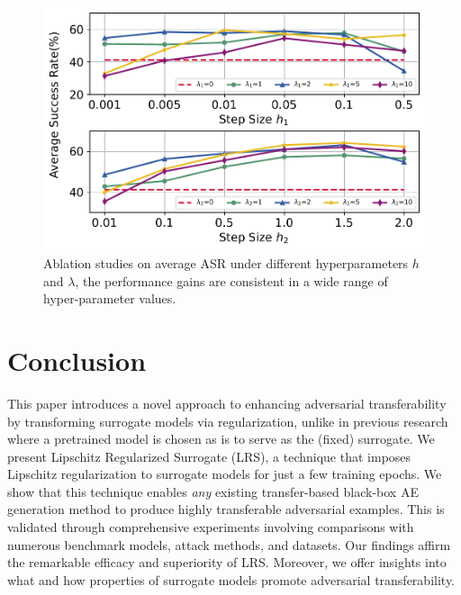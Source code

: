 \documentclass[letterpaper]{article} %
\theoremstyle{plain}
\theoremstyle{definition}
\begin{document}
\begin{figure}[h!]
    \centering
    \includegraphics[width=\linewidth]{figs/ablation.pdf}\vspace{-1mm}
    \caption{Ablation studies on average ASR under different hyperparameters $h$ and $\lambda$, the performance gains are consistent in a wide range of hyper-parameter values.}
    \label{fig:ablation}\vspace{-2mm}
\end{figure}

\section{Conclusion}  \label{sec:conclusion} 
This paper introduces a novel approach to enhancing adversarial transferability by transforming surrogate models via regularization, unlike in previous research where a pretrained model is chosen as is to serve as the (fixed) surrogate. We present Lipschitz Regularized Surrogate (LRS), a technique that imposes Lipschitz regularization to surrogate models for just a few training epochs. We show that this technique enables {\em any} existing transfer-based black-box AE generation method to produce highly transferable adversarial examples. This is validated through comprehensive experiments involving comparisons with numerous benchmark models, attack methods, and datasets. Our findings affirm the remarkable efficacy and superiority of LRS. Moreover, we offer insights into what and how properties of surrogate models promote adversarial transferability.
\end{document}
